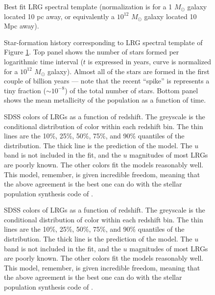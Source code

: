 \clearpage

\setcounter{thefigs}{0}

\clearpage
{}
\begin{figure}
\figurenum{\fignum}
\caption{\label{spec_lrg} Best fit LRG spectral template
	(normalization is for a 1 $M_\odot$ galaxy located 10 pc away, or
	equivalently a $10^{12}$ $M_\odot$ galaxy located 10 Mpc away).}
\end{figure}

\clearpage
{}
\begin{figure}
\figurenum{\fignum}
\caption{\label{sfh_lrg} Star-formation history corresponding to LRG
	spectral template of Figure \ref{spec_lrg}. Top panel shows the
	number of stars formed per logarithmic time interval ($t$ is
	expressed in years, curve is normalized for a $10^{12}$ $M_\odot$
	galaxy). Almost all of the stars are formed in the first couple of
	billion years --- note that the recent ``spike'' is represents a
	tiny fraction ($\sim 10^{-8}$) of the total number of stars. Bottom
	panel shows the mean metallicity of the population as a function of
	time.  }
\end{figure}

\clearpage
{}
\begin{figure}
\figurenum{\fignum}
\caption{\label{lrg_colors} SDSS colors of LRGs as a function of
	redshift. The greyscale is the conditional distribution of color
	within each redshift bin. The thin lines are the 10\%, 25\%, 50\%,
	75\%, and 90\% quantiles of the distribution. The thick line
	is the prediction of the model. The $u$ band is not included in the
	fit, and the $u$ magnitudes of most LRGs are poorly known. The other
	colors fit the models reasonably well. This model, remember, is
	given incredible freedom, meaning that the above agreement is the
	best one can do with the stellar population synthesis code of
	\citet{bruzual03a}. }
\end{figure}

\clearpage
{}
\begin{figure}
\figurenum{\fignum}
\caption{\label{sfh_templates} SDSS colors of LRGs as a function of
	redshift. The greyscale is the conditional distribution of color
	within each redshift bin. The thin lines are the 10\%, 25\%, 50\%,
	75\%, and 90\% quantiles of the distribution. The thick line
	is the prediction of the model. The $u$ band is not included in the
	fit, and the $u$ magnitudes of most LRGs are poorly known. The other
	colors fit the models reasonably well. This model, remember, is
	given incredible freedom, meaning that the above agreement is the
	best one can do with the stellar population synthesis code of
	\citet{bruzual03a}. }
\end{figure}

